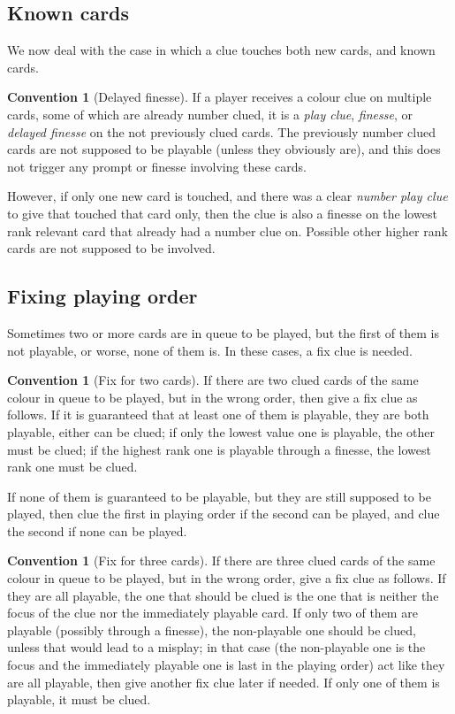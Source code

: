 \documentclass[a4paper]{article}
\theoremstyle{plain}
\theoremstyle{definition}
\newtheorem{convention}[theorem]{Convention}
\begin{document}
\subsection{Known cards}

We now deal with the case in which a clue touches both new cards, and known cards.

\begin{convention}[Delayed finesse]
If a player receives a colour clue on multiple cards, some of which are already number clued, it is a \emph{play clue}, \emph{finesse}, or \emph{delayed finesse} on the not previously clued cards. The previously number clued cards are not supposed to be playable (unless they obviously are), and this does not trigger any prompt or finesse involving these cards.

However, if only one new card is touched, and there was a clear \emph{number play clue} to give that touched that card only, then the clue is also a finesse on the lowest rank relevant card that already had a number clue on. Possible other higher rank cards are not supposed to be involved.
\end{convention}

\subsection{Fixing playing order}

Sometimes two or more cards are in queue to be played, but the first of them is not playable, or worse, none of them is. In these cases, a fix clue is needed.

\begin{convention}[Fix for two cards]	
	If there are two clued cards of the same colour in queue to be played, but in the wrong order, then give a fix clue as follows. If it is guaranteed that at least one of them is playable, they are both playable, either can be clued; if only the lowest value one is playable, the other must be clued; if the highest rank one is playable through a finesse, the lowest rank one must be clued.
	
	If none of them is guaranteed to be playable, but they are still supposed to be played, then clue the first in playing order if the second can be played, and clue the second if none can be played.
\end{convention}
	
\begin{convention}[Fix for three cards]
	If there are three clued cards of the same colour in queue to be played, but in the wrong order, give a fix clue as follows. If they are all playable, the one that should be clued is the one that is neither the focus of the clue nor the immediately playable card. If only two of them are playable (possibly through a finesse), the non-playable one should be clued, unless that would lead to a misplay; in that case (the non-playable one is the focus and the immediately playable one is last in the playing order) act like they are all playable, then give another fix clue later if needed. If only one of them is playable, it must be clued.
\end{convention}
\end{document}
